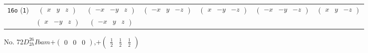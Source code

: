 \documentclass[fleqn,9pt,landscape]{jsarticle}
\begin{document}
\begin{center}
\begin{longtable}{ccccccc}
{\tt 16o} ({\tt 1}) & $ \begin{pmatrix} x & y & z \end{pmatrix} $ & $ \begin{pmatrix} - x & - y & z \end{pmatrix} $ & $ \begin{pmatrix} - x & y & - z \end{pmatrix} $ & $ \begin{pmatrix} x & - y & - z \end{pmatrix} $ & $ \begin{pmatrix} - x & - y & - z \end{pmatrix} $ & $ \begin{pmatrix} x & y & - z \end{pmatrix} $ \\
& $ \begin{pmatrix} x & - y & z \end{pmatrix} $ & $ \begin{pmatrix} - x & y & z \end{pmatrix} $ & $  $ & $  $ & $  $ & $  $ \\
\end{longtable}
\end{center}
\newpage
No. 72\quad$D_{2h}^{26}$\quad$Ibam$\quad[ orthorhombic ]\quad$+\begin{pmatrix} 0 & 0 & 0 \end{pmatrix}$,\quad $+\begin{pmatrix} \frac{1}{2} & \frac{1}{2} & \frac{1}{2} \end{pmatrix}$
\end{document}
